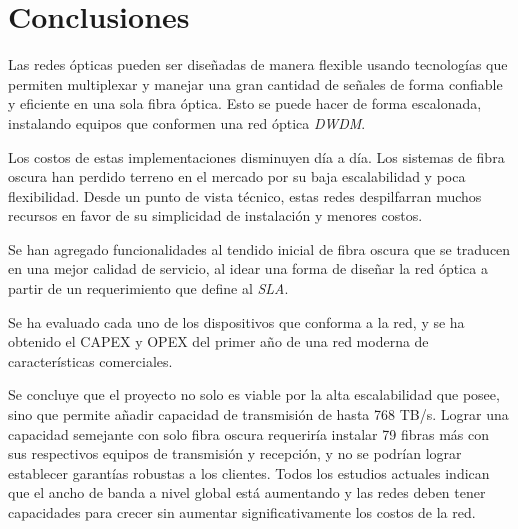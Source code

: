 \section{Conclusiones}\label{sec:conclusiones}

Las redes ópticas pueden ser diseñadas de manera flexible usando
tecnologías que permiten multiplexar y manejar una gran cantidad de
señales de forma confiable y eficiente en una sola fibra óptica. Esto
se puede hacer de forma escalonada, instalando equipos que conformen
una red óptica \emph{DWDM}.

Los costos de estas implementaciones disminuyen día a día. Los
sistemas de fibra oscura han perdido terreno en el mercado por su baja
escalabilidad y poca flexibilidad. Desde un punto de vista técnico,
estas redes despilfarran muchos recursos en favor de su simplicidad de
instalación y menores costos.

Se han agregado funcionalidades al tendido inicial de fibra oscura que
se traducen en una mejor calidad de servicio, al idear una forma de
diseñar la red óptica a partir de un requerimiento que define al
\emph{SLA}.

Se ha evaluado cada uno de los dispositivos que conforma a la red, y
se ha obtenido el CAPEX y OPEX del primer año de una red moderna de
características comerciales.

Se concluye que el proyecto no solo es viable por la alta
escalabilidad que posee, sino que permite añadir capacidad de
transmisión de hasta 768 TB/s. Lograr una capacidad semejante con solo
fibra oscura requeriría instalar 79 fibras más con sus respectivos
equipos de transmisión y recepción, y no se podrían lograr establecer
garantías robustas a los clientes. Todos los estudios actuales indican
que el ancho de banda a nivel global está aumentando y las redes deben
tener capacidades para crecer sin aumentar significativamente los
costos de la red.
